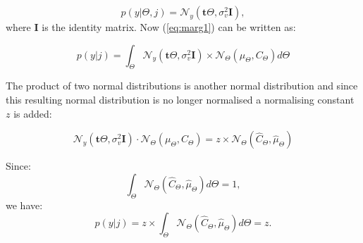 \begin{equation}\label{eq:probybeta}
p(y|\Theta,j) = \mathcal{N}_y(\textbf{t}\Theta,\sigma_v^2\textbf{I}),
\end{equation}
where $\textbf{I}$ is the identity matrix.
Now (\ref{eq:marg1}) can be written as:

\begin{equation}\label{eq:marg2}
p(y|j) = \int_\Theta \mathcal{N}_y(\textbf{t}\Theta,\sigma_v^2 \textbf{I})\times\mathcal{N}_\Theta(\mu_\Theta,C_\Theta) d\Theta
\end{equation}

The product of two normal distributions is another normal distribution and since this resulting normal distribution is no longer normalised a normalising constant $z$ is added:

\begin{equation}\label{eq:prod1}
\mathcal{N}_y(\textbf{t}\Theta,\sigma_v^2 \textbf{I})\cdot\mathcal{N}_\Theta(\mu_\Theta,C_\Theta) = z \times \mathcal{N}_\Theta(\hat{C}_\Theta,\hat{\mu}_\Theta)
\end{equation}

Since:
\begin{equation}\label{eq:marg3}
\int_\Theta \mathcal{N}_\Theta(\hat{C}_\Theta,\hat{\mu}_\Theta) d\Theta = 1,
\end{equation}
we have:
\begin{equation}\label{eq:marg4}
p(y|j) = z \times \int_\Theta \mathcal{N}_\Theta(\hat{C}_\Theta,\hat{\mu}_\Theta) d\Theta = z.
\end{equation}


